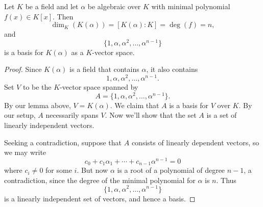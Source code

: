 \documentclass{ximera}
\begin{document}
\begin{theorem}\label{T:dae}
  Let $K$ be a field and let $\alpha$ be algebraic over $K$ with
  minimal polynomial $f(x)\in K[x]$. Then
  \[
  \dim_K(K(\alpha)) = [K(\alpha):K] = \deg(f) = n,
  \]
  and
  \[
  \{1,\alpha,\alpha^2,\dots,\alpha^{n-1}\}
  \]
  is a basis for $K(\alpha)$ as a $K$-vector space.
  \begin{proof}
    Since $K(\alpha)$ is a field that contains $\alpha$, it also contains
    \[
    1, \alpha, \alpha^2, \dots, \alpha^{n-1}.
    \]
    Set $V$ to be the $K$-vector space spanned by
    \[
    A = \{1,\alpha,\alpha^2,\dots,\alpha^{n-1}\}.
    \]
    By our lemma above, $V = K(\alpha)$.  We claim that $A$ is a basis for
    $V$ over $K$. By our setup, $A$ necessarily spans $V$. Now we'll
    show that the set $A$ is a set of linearly independent vectors.

    Seeking a contradiction, suppose that $A$ consists of linearly
    dependent vectors, so we may write
    \[
    c_0 + c_1\alpha_1 + \cdots + c_{n-1}\alpha^{n-1} =0
    \]
    where $c_i\ne 0$ for some $i$. But now $\alpha$ is a root of a
    polynomial of degree $n-1$, a contradiction, since the degree of
    the minimal polynomial for $\alpha$ is $n$. Thus
    \[
    \{1,\alpha,\alpha^2,\dots,\alpha^{n-1}\}
    \]
    is a linearly independent set of vectors, and hence a basis.
  \end{proof}
\end{theorem}
\end{document}
